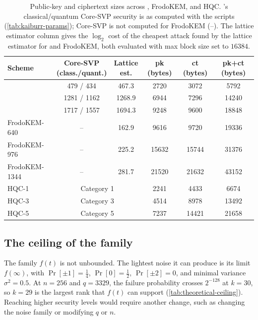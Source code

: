 \begin{table}[h]
\centering
\caption[Public-key and ciphertext sizes across \kaiburr, FrodoKEM, and HQC.]{Public-key and ciphertext sizes across \kaiburr,
FrodoKEM, and HQC. \kaiburr's classical/quantum Core-SVP security is as computed with
the \kyber scripts (\cref{tab:kaiburr-params}); Core-SVP is not computed for FrodoKEM (--). The lattice estimator
column gives the $\log_2$ cost of the cheapest attack found by the lattice estimator for
\kaiburr and FrodoKEM, both evaluated with max block
size set to $16384$.}
\label{tab:size-comparison}
\begin{tabular}{lccccc}
\toprule
Scheme & \makecell{Core-SVP\\(class./quant.)} & \makecell{Lattice\\est.} & pk (bytes) & ct (bytes) & pk+ct (bytes) \\
\midrule
\kaiburr-1792 & 479 / 434   & 467.3  & 2720  & 3072  & 5792  \\
\kaiburr-4608 & 1281 / 1162 & 1268.9 & 6944  & 7296  & 14240 \\
\kaiburr-6144 & 1717 / 1557 & 1694.3 & 9248  & 9600  & 18848 \\
\midrule
FrodoKEM-640  & --          & 162.9  & 9616  & 9720  & 19336 \\
FrodoKEM-976  & --          & 225.2  & 15632 & 15744 & 31376 \\
FrodoKEM-1344 & --          & 281.7  & 21520 & 21632 & 43152 \\
\midrule
HQC-1 & \multicolumn{2}{c}{Category 1\footnotemark} & 2241 & 4433  & 6674  \\
HQC-3 & \multicolumn{2}{c}{Category 3} & 4514 & 8978  & 13492 \\
HQC-5 & \multicolumn{2}{c}{Category 5} & 7237 & 14421 & 21658 \\
\bottomrule
\end{tabular}
\end{table}

\subsection{The ceiling of the family}
The family $f(t)$ is not unbounded. The lightest noise it can
produce is its limit $f(\infty)$, with $\Pr[\pm 1]=\tfrac14$,
$\Pr[0]=\tfrac12$, $\Pr[\pm 2]=0$, and minimal variance
$\sigma^2=0.5$. At $n=256$ and $q=3329$, the failure probability crosses
$2^{-128}$ at $k=30$, so $k=29$ is the largest rank that $f(t)$ can
support (\cref{tab:theoretical-ceiling}). Reaching higher
security levels would require another change, such as changing the noise family or modifying $q$ or $n$.

